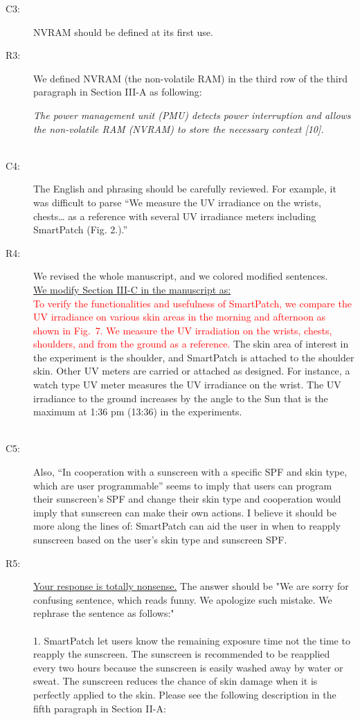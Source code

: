 \documentclass[onecolumn]{IEEEconf}
\begin{document}
\begin{description}
\item [C3: ] NVRAM should be defined at its first use.
\item [R3: ] We defined NVRAM (the non-volatile RAM) in the third row of the third paragraph in Section III-A as following:

\textit{The power management unit (PMU) detects power interruption and allows the non-volatile RAM (NVRAM) to store the necessary context [10].}\\
~\\

\item [C4:] The English and phrasing should be carefully reviewed. For example, it was difficult to parse ``We measure the UV irradiance on the wrists, chests… as a reference with several UV irradiance meters including SmartPatch (Fig. 2.).'' 

\item [R4: ] We revised the whole manuscript, and we colored modified sentences. \\

\underline{We modify Section III-C in the manuscript as:}\\
\textcolor{red}{To verify the functionalities and usefulness of SmartPatch, we compare the UV irradiance on various skin areas in the morning and afternoon as shown in Fig.~7. We measure the UV irradiation on the wrists, chests, shoulders, and from the ground as a reference.} The skin area of interest in the experiment is the shoulder, and SmartPatch is attached to the shoulder skin. Other UV meters are carried or attached as designed. For instance, a watch type UV meter measures the UV irradiance on the wrist. The UV irradiance to the ground increases by the angle to the Sun that is the maximum at 1:36 pm (13:36) in the experiments.\\
~\\


\item [C5:] Also, ``In cooperation with a sunscreen with a specific SPF and skin type, which are user programmable'' seems to imply that users can program their sunscreen's SPF and change their skin type and cooperation would imply that sunscreen can make their own actions. I believe it should be more along the lines of: SmartPatch can aid the user in when to reapply sunscreen based on the user's skin type and sunscreen SPF.

\item [R5: ] \underline{Your response is totally nonsense.} The answer should be "We are sorry for confusing sentence, which reads funny. We apologize such mistake. We rephrase the sentence as follows:"\\ \\
1. SmartPatch let users know the remaining exposure time not the time to reapply the sunscreen. The sunscreen is recommended to be reapplied every two hours because the sunscreen is easily washed away by water or sweat. The sunscreen reduces the chance of skin damage when it is perfectly applied to the skin. Please see the following description in the fifth paragraph in Section II-A:\\


\end{description}
\end{document}
